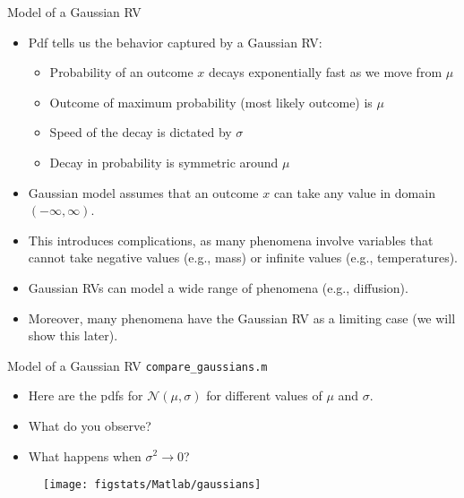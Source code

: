 \documentclass[handout,9pt]{beamer}
\begin{document}
%
\begin{frame}{Model of a Gaussian RV}


\begin{itemize}
\setlength{\itemsep}{10pt}
\item Pdf tells us the behavior captured by a Gaussian RV: 

\begin{itemize}
\setlength{\itemsep}{5pt}
\item Probability of an outcome $x$ decays exponentially fast as we move from $\mu$
\item Outcome of maximum probability (most likely outcome) is $\mu$
\item Speed of the decay is dictated by $\sigma$
\item Decay in probability is symmetric around $\mu$
\end{itemize}

\item Gaussian model assumes that an outcome $x$ can take any value in domain $(-\infty,\infty)$. 

\item This introduces complications, as many phenomena involve variables that cannot take negative values (e.g., mass) or infinite values (e.g., temperatures).   

\item Gaussian RVs can model a wide range of phenomena (e.g., diffusion). 

\item Moreover, many phenomena have the Gaussian RV as a limiting case (we will show this later). 
\end{itemize}

\end{frame}

%
\begin{frame}{Model of a Gaussian RV \footnotesize{\texttt{compare\_gaussians.m}}}
\begin{itemize}
\setlength{\itemsep}{10pt}
\item Here are the pdfs for $\mathcal{N}(\mu,\sigma)$ for different values of $\mu$ and $\sigma$.
\item What do you observe?
\item What happens when $\sigma^2\to 0$?
\end{itemize}
\begin{figure}[!htb]
    \centering
	\texttt{[image: figstats/Matlab/gaussians]}
\end{figure}
\end{frame}
\end{document}
